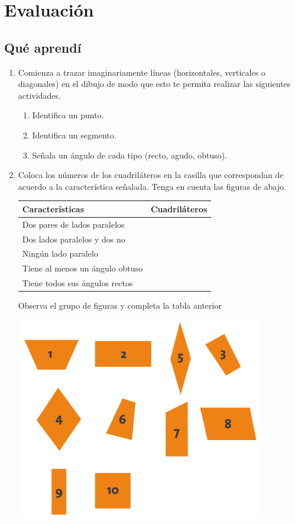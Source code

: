 \documentclass[10pt,twoside]{article}
\begin{document}
\section*{Evaluaci\'on}
\subsection*{Qu\'{e} aprend\'{i}}
\begin{enumerate}
\item Comienza a trazar imaginariamente líneas (horizontales,
verticales o diagonales) en el dibujo de modo que esto te
permita realizar las siguientes actividades.
\begin{enumerate}
\item Identifica un punto.
\item Identifica un segmento.
\item Señala un ángulo de cada tipo (recto, agudo, obtuso).
\end{enumerate}
\item Coloca los números de los cuadriláteros en la casilla que
correspondan de acuerdo a la característica señalada. Tenga en cuenta las figuras de abajo.
\begin{center}
\begin{tabular}{|l|c|}
\hline 
\hspace*{40pt} Características & Cuadriláteros \\ 
\hline 
Dos pares de lados paralelos &  \\ 
\hline 
Dos lados paralelos y dos no  &  \\ 
\hline 
Ningún lado paralelo &  \\ 
\hline 
Tiene al menos un ángulo obtuso &  \\ 
\hline 
Tiene todos sus ángulos rectos &  \\ 
\hline 
\end{tabular} 
\end{center}
Observa el grupo de figuras y completa la tabla anterior
\begin{center}
\includegraphics[scale=.7]{Images/Figuras.png} 
\end{center}

\end{enumerate}
\end{document}
